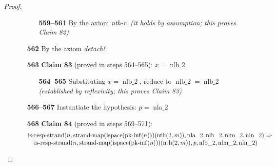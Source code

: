 \documentclass[11pt]{article}
\theoremstyle{plain}
\begin{document}
\begin{proof}
\begin{itemize}[leftmargin=2.8em, itemsep=4pt, parsep=1pt]
\begin{itemize}[leftmargin=2.8em, itemsep=4pt, parsep=1pt]
  \begin{itemize}[leftmargin=2.8em, itemsep=4pt, parsep=1pt]
  \item[\textbf{559--561}] By the axiom \emph{nth-r}.  \emph{(it holds by assumption; this proves Claim 82)}
  \end{itemize}
  \item[\textbf{562}] By the axiom \emph{detach!}.
  \item[\textbf{563}] \textbf{Claim 83} (proved in steps 564--565): $x = \operatorname{nlb\_2}$
  \begin{itemize}[leftmargin=2.8em, itemsep=4pt, parsep=1pt]
  \item[\textbf{564--565}] Substituting $x = \operatorname{nlb\_2}$, reduce to $\operatorname{nlb\_2} = \operatorname{nlb\_2}$  \emph{(established by reflexivity; this proves Claim 83)}
  \end{itemize}
  \item[\textbf{566--567}] Instantiate the hypothesis: $p = \operatorname{nla\_2}$
  \item[\textbf{568}] \textbf{Claim 84} (proved in steps 569--571):
\begin{equation*}
\begin{array}{@{}l@{}} \operatorname{is\text{-}resp\text{-}strand}(n, \operatorname{strand\text{-}map}(\operatorname{ispace}(\operatorname{pk\text{-}inf}(n)))(\operatorname{nth}(2, m)), \operatorname{nla\_2}, \operatorname{nlb\_2}, \operatorname{nlm\_2}, \operatorname{nln\_2}) \Rightarrow  \\ \quad \operatorname{is\text{-}resp\text{-}strand}(n, \operatorname{strand\text{-}map}(\operatorname{ispace}(\operatorname{pk\text{-}inf}(n)))(\operatorname{nth}(2, m)), p, \operatorname{nlb\_2}, \operatorname{nlm\_2}, \operatorname{nln\_2}) \end{array}
\end{equation*}


\end{itemize}
\end{itemize}
\end{proof}
\end{document}
